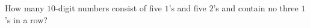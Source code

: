 How many $10$-digit numbers consist of five $1$'s and five $2$'s and contain no three $1$'s in a row?
